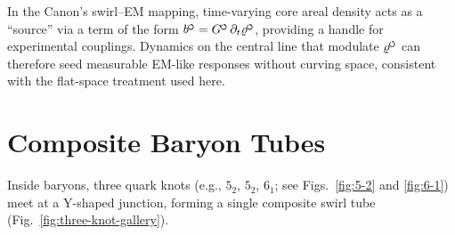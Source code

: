 \documentclass[11pt]{article}
\newcommand{\swirlarrow}{%
    \mathchoice{\mkern-2mu\scriptstyle\boldsymbol{\circlearrowleft}}%
    {\mkern-2mu\scriptstyle\boldsymbol{\circlearrowleft}}%
    {\mkern-2mu\scriptscriptstyle\boldsymbol{\circlearrowleft}}%
    {\mkern-2mu\scriptscriptstyle\boldsymbol{\circlearrowleft}}%
}
\begin{document}
    \begin{tcolorbox}[title=\textbf{Swirl–EM correspondence (operational note)}]
        In the Canon’s swirl–EM mapping, time-varying core areal density acts as a “source” via a term of the form $b^{\swirlarrow}=G^{\swirlarrow}\,\partial_t \varrho^{\swirlarrow}$, providing a handle for experimental couplings. Dynamics on the central line that modulate $\varrho^{\swirlarrow}$ can therefore seed measurable EM-like responses without curving space, consistent with the flat-space treatment used here.
    \end{tcolorbox}

\section{Composite Baryon Tubes}
    Inside baryons, three quark knots (e.g., $5_2$, $5_2$, $6_1$; see Figs.~\ref{fig:5-2} and \ref{fig:6-1}) meet at a Y-shaped junction, forming a single composite swirl tube (Fig.~\ref{fig:three-knot-gallery}).
\end{document}
